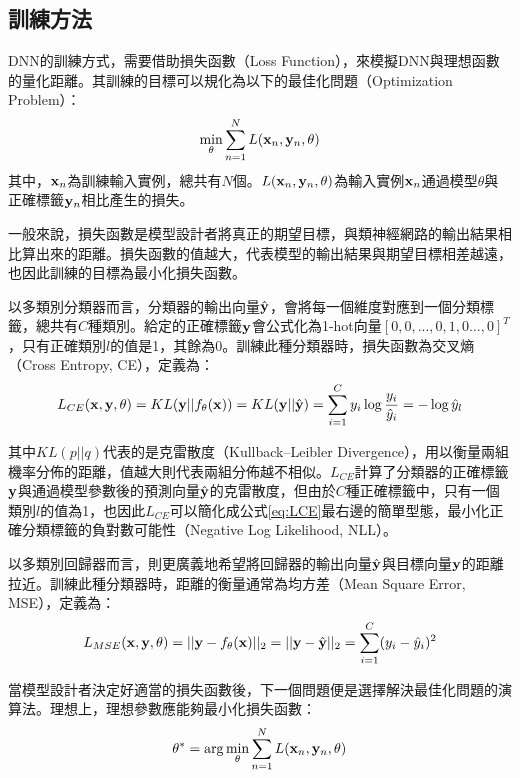 \subsection{訓練方法}
DNN的訓練方式，需要借助損失函數（Loss Function），來模擬DNN與理想函數的量化距離。其訓練的目標可以規化為以下的最佳化問題（Optimization Problem）：
\begin{equation}
\min_{\theta}{ \sum_{n=1}^{N}{ {L( \bold{x}_n , \bold{y}_n , \theta)}}}
\end{equation}
其中，$\bold{x}_n$為訓練輸入實例，總共有$N$個。$L(\bold{x}_n , \bold{y}_n, \theta)$為輸入實例$\bold{x}_n$通過模型$\theta$與正確標籤$\bold{y}_n$相比產生的損失。

一般來說，損失函數是模型設計者將真正的期望目標，與類神經網路的輸出結果相比算出來的距離。損失函數的值越大，代表模型的輸出結果與期望目標相差越遠，也因此訓練的目標為最小化損失函數。

以多類別分類器而言，分類器的輸出向量$\hat{\bold{y}}$，會將每一個維度對應到一個分類標籤，總共有$C$種類別。給定的正確標籤$\bold{y}$會公式化為1-hot向量$[0 , 0 , ... , 0 , 1 , 0 ... , 0]^T $，只有正確類別$l$的值是1，其餘為0。訓練此種分類器時，損失函數為交叉熵（Cross Entropy, CE），定義為：
\begin{equation} \label{eq:LCE}
L_{CE}(\bold{x} , \bold{y} , \theta) = KL( \bold{y} || f_{\theta}(\bold{x}) ) = KL(\bold{y} || \hat{\bold{y} }) = \sum_{i = 1}^{C} y_i \log{ \frac{y_i}{\hat{y}_i} } = - \log \hat{y}_{l} 
\end{equation}

其中$KL(p||q)$代表的是克雷散度（Kullback–Leibler Divergence），用以衡量兩組機率分佈的距離，值越大則代表兩組分佈越不相似。$L_{CE}$計算了分類器的正確標籤$\bold{y}$與通過模型參數後的預測向量$\hat{\bold{y}}$的克雷散度，但由於$C$種正確標籤中，只有一個類別$l$的值為1，也因此$L_{CE}$可以簡化成公式\ref{eq:LCE}最右邊的簡單型態，最小化正確分類標籤的負對數可能性（Negative Log Likelihood, NLL）。

以多類別回歸器而言，則更廣義地希望將回歸器的輸出向量$\hat{\bold{y}}$與目標向量$\bold{y}$的距離拉近。訓練此種分類器時，距離的衡量通常為均方差（Mean Square Error, MSE），定義為：
\begin{equation}
L_{MSE}(\bold{x} , \bold{y} , \theta) = || \bold{y} - f_{\theta}(\bold{x}) ||_2 = || \bold{y} - \hat{\bold{y}} ||_2 = \sum_{i = 1}^{C} ( y_i - \hat{y}_i )^2 
\end{equation}

當模型設計者決定好適當的損失函數後，下一個問題便是選擇解決最佳化問題的演算法。理想上，理想參數應能夠最小化損失函數：
\begin{equation}
\theta^* = \arg\min_{\theta}{ \sum_{n=1}^{N}{ {L( \bold{x}_n , \bold{y}_n , \theta)}}}
\end{equation}

